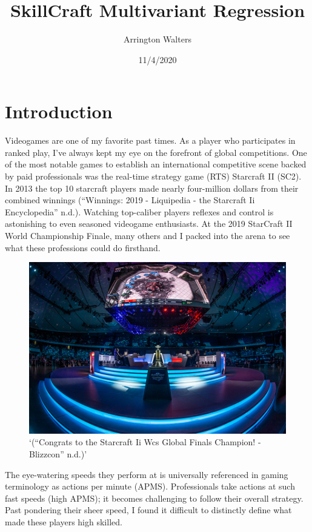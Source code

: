 \documentclass[]{article}
\title{SkillCraft Multivariant Regression}
\author{Arrington Walters}
\date{11/4/2020}
\begin{document}
\maketitle

\hypertarget{introduction}{%
\section{Introduction}\label{introduction}}

Videogames are one of my favorite past times. As a player who
participates in ranked play, I've always kept my eye on the forefront of
global competitions. One of the most notable games to establish an
international competitive scene backed by paid professionals was the
real-time strategy game (RTS) Starcraft II (SC2). In 2013 the top 10
starcraft players made nearly four-million dollars from their combined
winnings (``Winnings: 2019 - Liquipedia - the Starcraft Ii
Encyclopedia'' n.d.). Watching top-caliber players reflexes and control
is astonishing to even seasoned videogame enthusiasts. At the 2019
StarCraft II World Championship Finale, many others and I packed into
the arena to see what these professions could do firsthand.

\begin{figure}
\centering
\includegraphics{./inline/WCS.png}
\caption{`(``Congrats to the Starcraft Ii Wcs Global Finals Champion! -
Blizzcon'' n.d.)'}
\end{figure}

The eye-watering speeds they perform at is universally referenced in
gaming terminology as actions per minute (APMS). Professionals take
actions at such fast speeds (high APMS); it becomes challenging to
follow their overall strategy. Past pondering their sheer speed, I found
it difficult to distinctly define what made these players high skilled.
\end{document}
